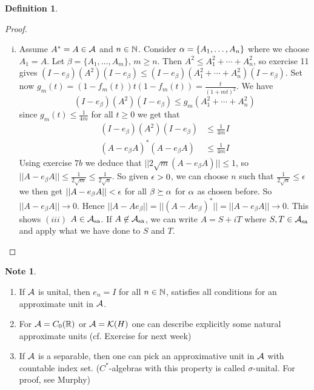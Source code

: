 \documentclass[10pt,english,a4paper]{article}
\theoremstyle{definition}
\newtheorem*{definition}{Definition}
\newtheorem*{note}{Note}
\def\Assa{\As_{\text{sa}}}
\begin{document}
\begin{definition}
\begin{proof}
\begin{enumerate}[(i)]
\item 
Assume $A^* = A \in \mathcal{A}$ and $n \in \mathbb{N}$.
Consider $\alpha = \{A_1, \ldots, A_n\}$ where we choose $A_1 = A$.
Let  $\beta = \{A_1, \ldots, A_m\}$, $m \geq n$. Then 
$A^2 \leq A_{1}^{2} + \cdots + A_{n}^{2}$, so 
exercise 11 gives 
$(I - e_{\beta} )(A^2) (I -e_{\beta})\leq (I -e_{\beta})(A_{1}^{2} + \cdots +
A_{n}^{2})(I -e_{\beta})$. Set now 
$g_m(t) = (1-f_m(t))t (1-f_m(t)) = \frac{t}{(1+mt)^2}$.
We have 
\[ (I - e_{\beta} )(A^2) (I -e_{\beta})\leq 
g_m(A_{1}^{2} + \cdots + A_{n}^{2})
\]
since $g_m(t) \leq \frac{1}{4m}$ for all $t \geq 0$ we get that
\begin{align*}
    (I - e_{\beta} )(A^2) (I -e_{\beta}) &\leq \frac{1}{4m} I \\
    (A-e_{\beta}A)^* (A - e_{\beta}A) &\leq \frac{1}{4m} I
\end{align*}
Using exercise $7b$ we deduce that 
$||2\sqrt{m} (A -e_{\beta}A)|| \leq 1$, so $||A-e_{\beta}A|| \leq
\frac{1}{2\sqrt{m}} \leq \frac{1}{2\sqrt{n}}$.
So given $\epsilon > 0$, we can choose $n$ such that $\tfrac{1}{2\sqrt{n}} \leq \epsilon$
we then get $||A-e_{\beta}A||< \epsilon$ for all $\beta \succeq \alpha$ for $\alpha$ as 
chosen before. So $||A-e_{\beta}A || \to 0$. Hence 
$||A-Ae_{\beta}|| = ||(A - Ae_{\beta})^*|| = ||A-e_{\beta}A|| \to 0$.
This shows $(iii)$ $A \in \Assa$. If $A \not\in \Assa$, we can write 
$A = S + iT$ where $S,T \in \Assa$ and apply what we have done to $S$ and $T$.

\end{enumerate}

\end{proof}


\begin{note}
\leavevmode
\begin{enumerate}[(1)]
    \item If $\mathcal{A}$ is unital, then $e_{n}  =I$ for all $n \in \mathbb{N}$, satisfies 
all conditions for an approximate unit in $\mathcal{A}$.

\item For $\mathcal{A} = C_{0}(\mathbb{R})$ or $\mathcal{A} = \mathcal{K}(H)$ one can describe 
explicitly some natural approximate units (cf. Exercise for next week)

\item If $\mathcal{A}$ is a separable, then one can pick an approximative unit in 
$\mathcal{A}$ with countable index set. 
($C^*$-algebras with this property is called $\sigma$-unital. For proof, see 
Murphy)

\end{enumerate}    

\end{note}

\end{definition}
\end{document}
